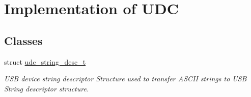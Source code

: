 \hypertarget{group__udc__group__interne}{\section{Implementation of U\-D\-C}
\label{group__udc__group__interne}
}
\subsection*{Classes}
\begin{DoxyCompactItemize}
\item 
struct \hyperlink{structudc__string__desc__t}{udc\-\_\-string\-\_\-desc\-\_\-t}
\begin{DoxyCompactList}\small\item\em U\-S\-B device string descriptor Structure used to transfer A\-S\-C\-I\-I strings to U\-S\-B String descriptor structure. \end{DoxyCompactList}\end{DoxyCompactItemize}
